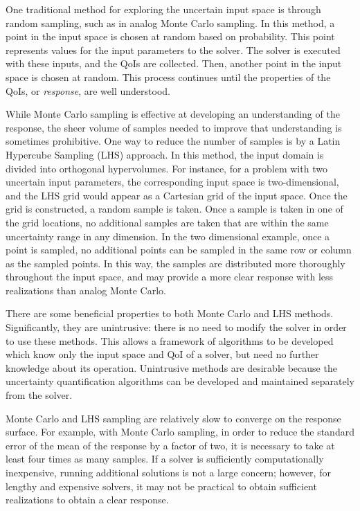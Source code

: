 One traditional method for exploring the uncertain input space is through random sampling, such as in analog Monte
Carlo sampling.  In this method, a point in the input space is chosen at random based on probability.  This
point represents values for the input parameters to the solver.  The solver is executed with these inputs, and
the QoIs are collected.  Then, another point in the input space is chosen at random.  This process continues
until the properties of the QoIs, or \emph{response}, are well understood.

While Monte Carlo sampling is effective at developing an understanding of the response, the sheer volume of
samples needed to improve that understanding is sometimes prohibitive.  One way to reduce the number of
samples is by a Latin Hypercube Sampling (LHS) approach.  In this method, the input domain is divided into
orthogonal hypervolumes.  For instance, for a problem with two uncertain input parameters, the corresponding
input space is two-dimensional, and the LHS grid would appear as a Cartesian grid of the input space.  Once
the grid is constructed, a random sample is taken.  Once a sample is taken in one of the grid locations, no
additional samples are taken that are within the same uncertainty range in any dimension.  In the two
dimensional example, once a point is sampled, no additional points can be sampled in the same row or column as
the sampled points.  In this way, the samples are distributed more thoroughly throughout the input space, and
may provide a more clear response with less realizations than analog Monte Carlo.

There are some beneficial properties to both Monte Carlo and LHS methods.  Significantly, they are unintrusive:
 there is no need to modify the solver in order to use these methods.  This allows a framework of
algorithms to be developed which know only the input space and QoI of a solver, but need no further knowledge
about its operation.  Unintrusive methods are desirable because the uncertainty quantification algorithms can
be developed and maintained separately from the solver.

Monte Carlo and LHS sampling are relatively slow to converge on the response surface.  For
example, with Monte Carlo sampling, in order to reduce the standard error of the mean of the response by a factor
of two, it is necessary to take at least four times as many samples.  If a solver is sufficiently computationally
inexpensive, running additional solutions is not a large concern; however, for lengthy and expensive solvers,
it may not be practical to obtain sufficient realizations to obtain a clear response.

